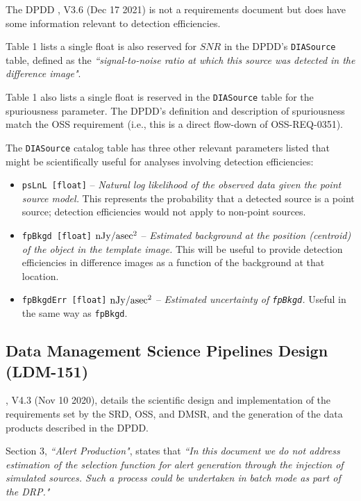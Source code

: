 The DPDD , V3.6 (Dec 17 2021) is not a requirements document but does have some information relevant to detection efficiencies.

Table 1 lists a single float is also reserved for ${SNR}$ in the DPDD's {\tt DIASource} table, defined as the {\it ``signal-to-noise ratio at which this source was detected in the difference image"}.

Table 1 also lists a single float is reserved in the {\tt DIASource} table for the spuriousness parameter.
The DPDD's definition and description of spuriousness match the OSS requirement (i.e., this is a direct flow-down of OSS-REQ-0351).

The {\tt DIASource} catalog table has three other relevant parameters listed that might be scientifically useful for analyses involving detection efficiencies:
\begin{itemize}
\item {\tt psLnL [float]} -- {\it Natural log likelihood of the observed data given the point source model.} This represents the probability that a detected source is a point source; detection efficiencies would not apply to non-point sources.
\item {\tt fpBkgd [float]} $\rm nJy/asec^2$ -- {\it Estimated background at the position (centroid) of the object in the template image.} This will be useful to provide detection efficiencies in difference images as a function of the background at that location.
\item {\tt fpBkgdErr [float]} $\rm nJy/asec^2$ -- {\it Estimated uncertainty of {\tt fpBkgd}.} Useful in the same way as {\tt fpBkgd}. 
\end{itemize}


\subsection{Data Management Science Pipelines Design (LDM-151)}\label{ssec:docs_ldm151}

, V4.3 (Nov 10 2020), details the scientific design and implementation of the requirements set by the SRD, OSS, and DMSR, and the generation of the data products described in the DPDD.

Section 3, {\it ``Alert Production"}, states that {\it ``In this document we do not address estimation of the selection function for alert generation through the injection of simulated sources. Such a process could be undertaken in batch mode as part of the DRP."}

